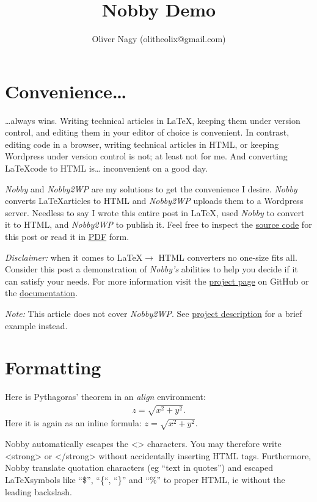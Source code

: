 \documentclass[10pt]{article}
\title{Nobby Demo}
\author{Oliver Nagy (olitheolix@gmail.com)}
\begin{document}
\maketitle

\section{Convenience\ldots}
\ldots always wins. Writing technical articles in \LaTeX, keeping them
under version control, and editing them in your editor of choice is
convenient. In contrast, editing code in a browser, writing technical
articles in HTML, or keeping Wordpress under version control is not;
at least not for me. And converting \LaTeX  code to HTML is\ldots
inconvenient on a good day.

\emph{Nobby} and \emph{Nobby2WP} are my solutions to get the convenience I
desire. \emph{Nobby} converts \LaTeX articles to HTML
and \emph{Nobby2WP} uploads them to a Wordpress server. Needless to
say I wrote this entire post in \LaTeX, used \emph{Nobby} to convert
it to HTML, and \emph{Nobby2WP} to publish it. Feel free to inspect the
\href{https://github.com/olitheolix/nobby/blob/master/demo/demo.tex}{source
code} for this post or read it in \href{./demo.pdf}{PDF} form.

\emph{Disclaimer:} when it comes to \LaTeX $\to $ HTML converters no
one-size fits all. Consider this post a demonstration of
\emph{Nobby's} abilities to help you decide if it can satisfy your needs. For
more information visit the \href{https://github.com/olitheolix/nobby}{project
  page} on GitHub or the \href{https://olitheolix.com/doc/nobby}{documentation}.

\emph{Note:} This article does not cover \emph{Nobby2WP}. See 
\href{https://github.com/olitheolix/nobby}{project description}
for a brief example instead.

\section{Formatting}
\label{sec:one}
Here is Pythagoras' theorem in an \emph{align} environment:
\begin{align}
  \label{eq:pyth}
  z = \sqrt{x^2 + y^2}.
\end{align}
Here it is again as an inline formula: $z = \sqrt{x^2 + y^2}$.

Nobby automatically escapes the <> characters. You may therefore
write <strong> or </strong> without accidentally inserting HTML tags.
Furthermore, Nobby translate quotation characters (eg ``text in quotes'') and
escaped \LaTeX symbols like ``\$'', ``\{``, ``\}'' and ``\%'' to proper HTML,
ie without the leading backslash.
\end{document}
